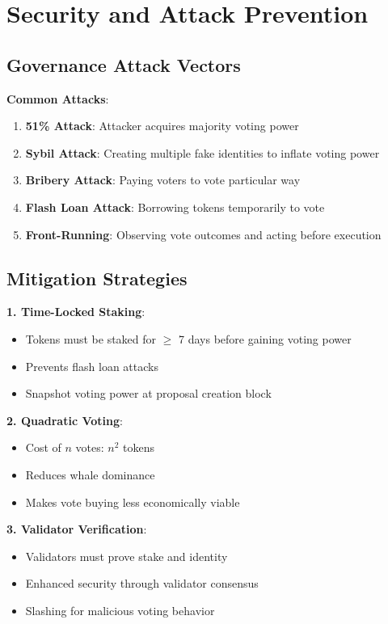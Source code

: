 \section{Security and Attack Prevention}


\subsection{Governance Attack Vectors}

\textbf{Common Attacks}:
\begin{enumerate}
\item \textbf{51\% Attack}: Attacker acquires majority voting power
\item \textbf{Sybil Attack}: Creating multiple fake identities to inflate voting power
\item \textbf{Bribery Attack}: Paying voters to vote particular way
\item \textbf{Flash Loan Attack}: Borrowing tokens temporarily to vote
\item \textbf{Front-Running}: Observing vote outcomes and acting before execution
\end{enumerate}

\subsection{Mitigation Strategies}

\textbf{1. Time-Locked Staking}:
\begin{itemize}
\item Tokens must be staked for $\geq$ 7 days before gaining voting power
\item Prevents flash loan attacks
\item Snapshot voting power at proposal creation block
\end{itemize}

\textbf{2. Quadratic Voting}:
\begin{itemize}
\item Cost of $n$ votes: $n^2$ tokens
\item Reduces whale dominance
\item Makes vote buying less economically viable
\end{itemize}

\textbf{3. Validator Verification}:
\begin{itemize}
\item Validators must prove stake and identity
\item Enhanced security through validator consensus
\item Slashing for malicious voting behavior
\end{itemize}

